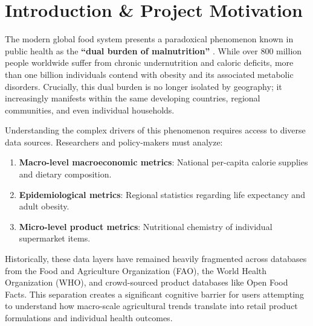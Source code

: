 \documentclass[10pt, a4paper]{article}
\begin{document}
\vfill

\newpage
\tableofcontents
\newpage

\section{Introduction \& Project Motivation}
\label{sec:intro}

The modern global food system presents a paradoxical phenomenon known in public health as the \textbf{``dual burden of malnutrition''} \cite{monteiro}. While over 800 million people worldwide suffer from chronic undernutrition and caloric deficits, more than one billion individuals contend with obesity and its associated metabolic disorders. Crucially, this dual burden is no longer isolated by geography; it increasingly manifests within the same developing countries, regional communities, and even individual households.

Understanding the complex drivers of this phenomenon requires access to diverse data sources. Researchers and policy-makers must analyze:
\begin{enumerate}[nosep, leftmargin=1.5em]
    \item \textbf{Macro-level macroeconomic metrics}: National per-capita calorie supplies and dietary composition.
    \item \textbf{Epidemiological metrics}: Regional statistics regarding life expectancy and adult obesity.
    \item \textbf{Micro-level product metrics}: Nutritional chemistry of individual supermarket items.
\end{enumerate}
Historically, these data layers have remained heavily fragmented across databases from the Food and Agriculture Organization (FAO), the World Health Organization (WHO), and crowd-sourced product databases like Open Food Facts. This separation creates a significant cognitive barrier for users attempting to understand how macro-scale agricultural trends translate into retail product formulations and individual health outcomes.
\end{document}

